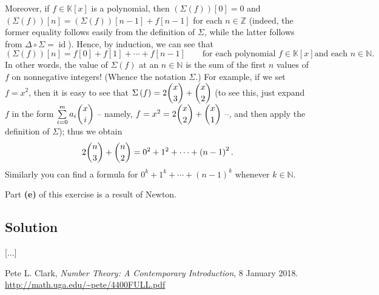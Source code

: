 \documentclass[paper=a4, fontsize=12pt]{scrartcl} %
\newcommand{\NN}{\mathbb{N}} %
\newcommand{\KK}{\mathbb{K}} %
\newcommand{\ZZ}{\mathbb{Z}} %
\newcommand{\id}{\operatorname{id}} %
\newcommand{\tup}[1]{\left( #1 \right)}
\newcommand{\ive}[1]{\left[ #1 \right]}
\let\sumnonlimits\sum
\renewcommand{\sum}{\sumnonlimits\limits}
\theoremstyle{plainsl}
\theoremstyle{definition}
\theoremstyle{remark}
\begin{document}
Moreover, if $f \in \KK\ive{x}$ is a polynomial, then
$\tup{\Sigma\tup{f}} \ive{0} = 0$
and
$\tup{\Sigma\tup{f}} \ive{n}
 = \tup{\Sigma\tup{f}} \ive{n-1} + f \ive{n-1}$
for each $n \in \ZZ$ (indeed, the former equality
follows easily from the definition of $\Sigma$,
while the latter follows from $\Delta \circ \Sigma = \id$).
Hence, by induction, we can see that
\[
\tup{\Sigma\tup{f}} \ive{n}
= f\ive{0} + f\ive{1} + \cdots + f\ive{n-1}
\qquad \text{for each polynomial $f \in \KK\ive{x}$
             and each $n \in \NN$}.
\]
In other words, the value of $\Sigma\tup{f}$ at an
$n \in \NN$ is the sum of the first $n$ values of
$f$ on nonnegative integers! (Whence the notation $\Sigma$.)
For example, if we set $f = x^2$, then it is easy to see
that $\Sigma\tup{f} = 2 \dbinom{x}{3} + \dbinom{x}{2}$
(to see this, just expand $f$ in the form
$\sum_{i=0}^m a_i \dbinom{x}{i}$ -- namely,
$f = x^2 = 2 \dbinom{x}{2} + \dbinom{x}{1}$ --, and
then apply the definition of $\Sigma$); thus we obtain
\[
2 \dbinom{n}{3} + \dbinom{n}{2}
= 0^2 + 1^2 + \cdots + \tup{n-1}^2 .
\]
Similarly you can find a formula for
$0^k + 1^k + \cdots + \tup{n-1}^k$ whenever $k \in \NN$.    

Part \textbf{(e)} of this exercise is a result of Newton.

\subsection{Solution}

[...]

\begin{thebibliography}{99999999}                                                                                         %



Pete L. Clark, \textit{Number Theory: A Contemporary Introduction},
8 January 2018. \\
\url{http://math.uga.edu/~pete/4400FULL.pdf}

\end{thebibliography}
\end{document}

